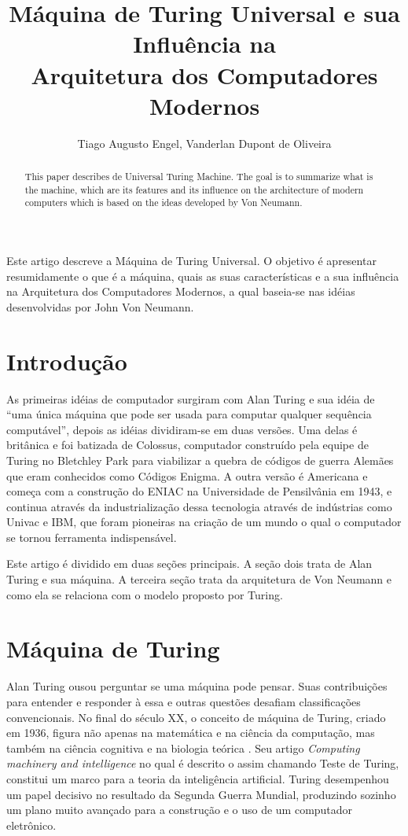 \documentclass[12pt]{article}
\title{Máquina de Turing Universal e sua Influência na \\ Arquitetura dos Computadores Modernos \\}
\author{Tiago Augusto Engel\inst{1}, Vanderlan Dupont de Oliveira\inst{1}}
\begin{document}
 

\maketitle
\begin{resumo} 
 Este artigo descreve a Máquina de Turing Universal. O objetivo é apresentar resumidamente o que é a máquina, quais as suas características e a sua influência na Arquitetura dos Computadores Modernos, a qual baseia-se nas idéias desenvolvidas por John Von Neumann.
\end{resumo}

\begin{abstract}
This paper describes de Universal Turing Machine. The goal is to summarize what is the machine, which are its features and its influence on the architecture of modern computers which is based on the ideas developed by Von Neumann.
\end{abstract}
     

\section{Introdução}

As primeiras idéias de computador surgiram com Alan Turing e sua idéia de “uma única máquina que pode ser usada para computar qualquer sequência computável”, depois as idéias dividiram-se em duas versões. Uma delas é britânica e foi batizada de Colossus, computador construído pela equipe de Turing no Bletchley Park para viabilizar a quebra de códigos de guerra Alemães que eram conhecidos como Códigos Enigma. A outra versão é Americana e começa com a construção do ENIAC na Universidade de Pensilvânia em 1943, e continua através da industrialização dessa tecnologia através de indústrias como Univac e IBM, que foram pioneiras na criação de um mundo o qual o computador se tornou ferramenta indispensável.

Este artigo é dividido em duas seções principais. A seção dois trata de Alan Turing e sua máquina. A terceira seção trata da arquitetura de Von Neumann  e como ela se relaciona com o modelo proposto por Turing.

\section{Máquina de Turing}

Alan Turing ousou perguntar se uma máquina pode pensar. Suas contribuições para entender e responder à essa e outras questões desafiam classificações convencionais. No final do século XX, o conceito de máquina de Turing, criado em 1936, figura não apenas na matemática e na ciência da computação, mas também na ciência cognitiva e na biologia teórica \cite{hodges1999}. Seu artigo \emph{Computing machinery and intelligence} \cite{Turing1950} no qual é descrito o assim chamando Teste de Turing, constitui um marco para a teoria da inteligência artificial. Turing desempenhou um papel decisivo no resultado da Segunda Guerra Mundial, produzindo sozinho um plano muito avançado para a construção e o uso de um computador eletrônico.
\end{document}
